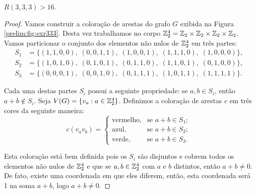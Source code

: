 \begin{proposition}
\label{prelim:thm:exr333}
$R(3,3,3) > 16$.
\end{proposition}
\begin{proof}
Vamos construir a coloração de arestas do grafo $G$ exibida na Figura \ref{prelim:fig:exr333}. Desta vez trabalhamos no corpo $\mathbb{Z}_{2}^4 = \mathbb{Z}_{2}\times\mathbb{Z}_{2}\times\mathbb{Z}_{2}\times\mathbb{Z}_{2}$. Vamos particionar o conjunto dos elementos não nulos de $\mathbb{Z}_{2}^4$ em três partes:
\begin{align*}
S_1&=\big\{ (1,1,0,0),\;(0,0,1,1),\;(1,0,0,1),\;(1,1,1,0),\;(1,0,0,0) \big\},\\
S_2&=\big\{ (1,0,1,0),\;(0,1,0,1),\;(0,1,1,0),\;(1,1,0,1),\;(0,1,0,0) \big\},\\
S_3&=\big\{ (0,0,0,1),\;(0,0,1,0),\;(0,1,1,1),\;(1,0,1,1),\;(1,1,1,1) \big\}.
\end{align*}

Cada uma destas partes $S_i$ possui a seguinte propriedade: se $a,b \in S_i$, então $a + b \not\in S_i$. Seja $V(G) = \{v_a : a \in \mathbb{Z}_{2}^4\}$. Definimos a coloração de arestas $c$ em três cores da seguinte maneira:
\[c(v_a v_b) = \begin{cases}
  \text{vermelho}, & \text{se } a + b \in S_1; \\
  \text{azul}, & \text{se } a + b \in S_2; \\
  \text{verde}, & \text{se } a + b \in S_3.
\end{cases}\]

Esta coloração está bem definida pois os $S_i$ são disjuntos e cobrem todos os elementos não nulos de $\mathbb{Z}_{2}^4$ e que se $a,b \in \mathbb{Z}_{2}^4$ com $a$ e $b$ distintos, então $a + b \neq 0$. De fato, existe uma coordenada em que eles diferem, então, esta coordenada será 1 na soma $a+b$, logo $a + b \neq 0$.


\end{proof}
